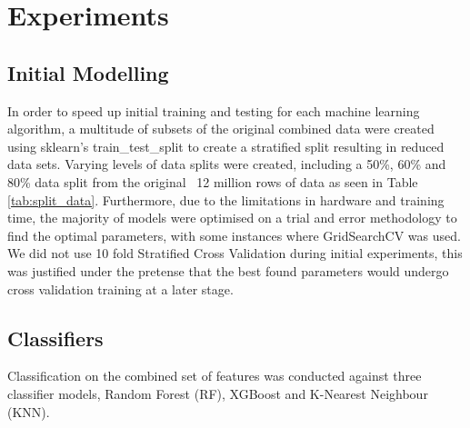 
\section{Experiments}
\label{sec: Experiments}

\subsection{Initial Modelling}
In order to speed up initial training and testing for each machine learning algorithm, a multitude of subsets of the original combined data were created using sklearn's train\_test\_split to create a stratified split resulting in reduced data sets. Varying levels of data splits were created, including a 50\%, 60\% and 80\% data split from the original ~12 million rows of data as seen in Table \ref{tab:split_data}. Furthermore, due to the limitations in hardware and training time, the majority of models were optimised on a trial and error methodology to find the optimal parameters, with some instances where GridSearchCV was used. We did not use 10 fold Stratified Cross Validation during initial experiments, this was justified under the pretense that the best found parameters would undergo cross validation training at a later stage. 

\subsection{Classifiers}

Classification on the combined set of features was conducted against three classifier models, Random Forest (RF), XGBoost and K-Nearest Neighbour (KNN).